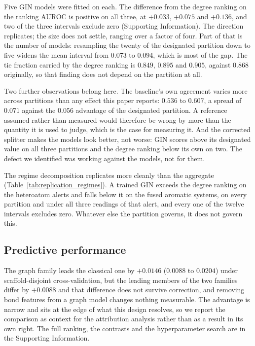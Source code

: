 \documentclass[journal=jcisd8,manuscript=article]{achemso}
\begin{document}
Five GIN models were fitted on each. The difference from the degree ranking on the
ranking AUROC is positive on all three, at $+0.033$, $+0.075$ and $+0.136$, and two
of the three intervals exclude zero (Supporting Information). The direction replicates;
the size does not settle, ranging over a factor of four. Part of that is the number of
models: resampling the twenty of the designated partition down to five widens the mean
interval from $0.073$ to $0.094$, which is most of the gap. The tie fraction carried by the
degree ranking is $0.849$, $0.895$ and $0.905$, against $0.868$ originally, so that finding
does not depend on the partition at all.

Two further observations belong here. The baseline's own agreement varies more across
partitions than any effect this paper reports: $0.536$ to $0.607$, a spread of $0.071$ against
the $0.056$ advantage of the designated partition. A reference assumed rather than measured
would therefore be wrong by more than the quantity it is used to judge, which is the case for
measuring it. And the corrected splitter makes the models look better, not worse: GIN
scores above its designated value on all three partitions and the degree ranking below its own
on two. The defect we identified was working against the models, not for them.


The regime decomposition replicates more cleanly than the aggregate
(Table~\ref{tab:replication_regimes}). A trained GIN exceeds the degree ranking on the
heteroatom alerts and falls below it on the fused aromatic systems, on every partition and
under all three readings of that alert, and every one of the twelve intervals excludes zero.
Whatever else the partition governs, it does not govern this.



\subsection{Predictive performance}
\label{sec:accuracy}

The graph family leads the classical one by $+0.0146$ ($0.0088$ to $0.0204$) under
scaffold-disjoint cross-validation, but the leading members of the two families differ by
$+0.0088$ and that difference does not survive correction, and removing bond features from a
graph model changes nothing measurable. The advantage is narrow and sits at the edge of what
this design resolves, so we report the comparison as context for the attribution analysis
rather than as a result in its own right. The full ranking, the contrasts and the
hyperparameter search are in the Supporting Information.
\end{document}
